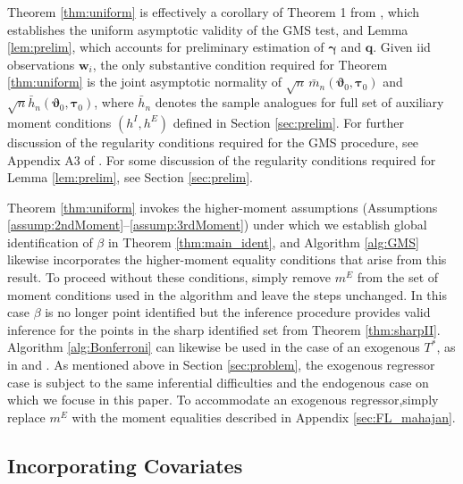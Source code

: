 Theorem \ref{thm:uniform} is effectively a corollary of Theorem 1 from \cite{AndrewsSoares}, which establishes the uniform asymptotic validity of the GMS test, and Lemma \ref{lem:prelim}, which accounts for preliminary estimation of $\boldsymbol{\gamma}$ and $\mathbf{q}$.
Given iid observations $\mathbf{w}_i$, the only substantive condition required for Theorem \ref{thm:uniform} is the joint asymptotic normality of $\sqrt{n} \,\bar{m}_n(\boldsymbol{\vartheta}_0, \boldsymbol{\tau}_0)$ and $\sqrt{n}\bar{h}_n(\boldsymbol{\vartheta}_0, \boldsymbol{\tau}_0)$, where $\bar{h}_n$ denotes the sample analogues for full set of auxiliary moment conditions $(h^I, h^E)$ defined in Section \ref{sec:prelim}.
For further discussion of the regularity conditions required for the GMS procedure, see Appendix A3 of \cite{AndrewsSoares}.
For some discussion of the regularity conditions required for Lemma \ref{lem:prelim}, see Section \ref{sec:prelim}.

Theorem \ref{thm:uniform} invokes the higher-moment assumptions (Assumptions \ref{assump:2ndMoment}--\ref{assump:3rdMoment}) under which we establish global identification of $\beta$ in Theorem \ref{thm:main_ident}, and Algorithm \ref{alg:GMS} likewise incorporates the higher-moment equality conditions that arise from this result.
To proceed without these conditions, simply remove $m^E$ from the set of moment conditions used in the algorithm and leave the steps unchanged.
In this case $\beta$ is no longer point identified but the inference procedure provides valid inference for the points in the sharp identified set from Theorem \ref{thm:sharpII}.
Algorithm \ref{alg:Bonferroni} can likewise be used in the case of an exogenous $T^*$, as in \cite{Mahajan} and \cite{FL}.
As mentioned above in Section \ref{sec:problem}, the exogenous regressor case is subject to the same inferential difficulties and the endogenous case on which we focuse in this paper.
To accommodate an exogenous regressor,simply replace $m^E$ with the moment equalities described in Appendix \ref{sec:FL_mahajan}.


\subsection{Incorporating Covariates}
\label{sec:covariates}

